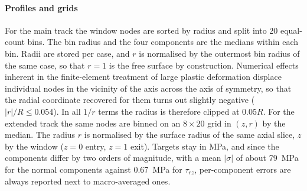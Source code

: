 \paragraph{Profiles and grids}
For the main track the window nodes are sorted by radius and split into 20 equal-count bins. The bin radius and the four components are the medians within each bin. %
Radii are stored per case, and $r$ is normalised by the outermost bin radius of the same case, so that $r=1$ is the free surface by construction. %
Numerical effects inherent in the finite-element treatment of large plastic deformation displace individual nodes in the vicinity of the axis across the axis of symmetry, so that the radial coordinate recovered for them turns out slightly negative ($|r|/R \le 0.054$). In all $1/r$ terms the radius is therefore clipped at $0.05R$. %
For the extended track the same nodes are binned on an $8\times20$ grid in $(z,r)$ by the median. The radius $r$ is normalised by the surface radius of the same axial slice, $z$ by the window ($z=0$ entry, $z=1$ exit). %
Targets stay in MPa, and since the components differ by two orders of magnitude, with a mean $|\sigma|$ of about 79~MPa for the normal components against 0.67~MPa for $\tau_{rz}$, per-component errors are always reported next to macro-averaged ones. %


